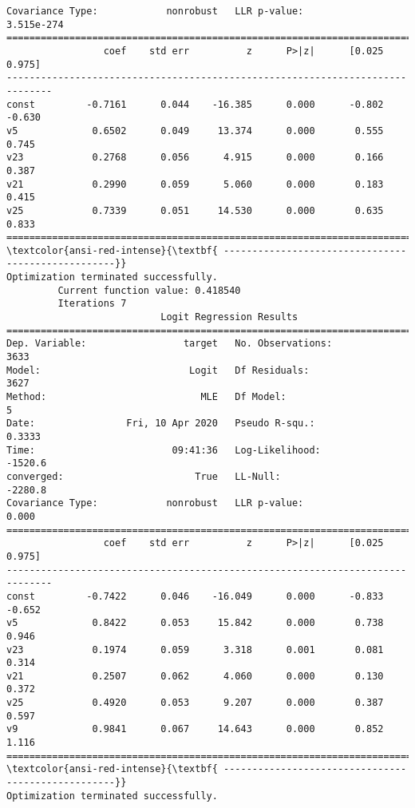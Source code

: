 \documentclass[11pt]{article}
\begin{document}
\begin{Verbatim}[commandchars=\\\{\}]
Covariance Type:            nonrobust   LLR p-value:                3.515e-274
==============================================================================
                 coef    std err          z      P>|z|      [0.025      0.975]
------------------------------------------------------------------------------
const         -0.7161      0.044    -16.385      0.000      -0.802      -0.630
v5             0.6502      0.049     13.374      0.000       0.555       0.745
v23            0.2768      0.056      4.915      0.000       0.166       0.387
v21            0.2990      0.059      5.060      0.000       0.183       0.415
v25            0.7339      0.051     14.530      0.000       0.635       0.833
==============================================================================
\textcolor{ansi-red-intense}{\textbf{ ---------------------------------------------------}}
Optimization terminated successfully.
         Current function value: 0.418540
         Iterations 7
                           Logit Regression Results                           
==============================================================================
Dep. Variable:                 target   No. Observations:                 3633
Model:                          Logit   Df Residuals:                     3627
Method:                           MLE   Df Model:                            5
Date:                Fri, 10 Apr 2020   Pseudo R-squ.:                  0.3333
Time:                        09:41:36   Log-Likelihood:                -1520.6
converged:                       True   LL-Null:                       -2280.8
Covariance Type:            nonrobust   LLR p-value:                     0.000
==============================================================================
                 coef    std err          z      P>|z|      [0.025      0.975]
------------------------------------------------------------------------------
const         -0.7422      0.046    -16.049      0.000      -0.833      -0.652
v5             0.8422      0.053     15.842      0.000       0.738       0.946
v23            0.1974      0.059      3.318      0.001       0.081       0.314
v21            0.2507      0.062      4.060      0.000       0.130       0.372
v25            0.4920      0.053      9.207      0.000       0.387       0.597
v9             0.9841      0.067     14.643      0.000       0.852       1.116
==============================================================================
\textcolor{ansi-red-intense}{\textbf{ ---------------------------------------------------}}
Optimization terminated successfully.

\end{Verbatim}
\end{document}
